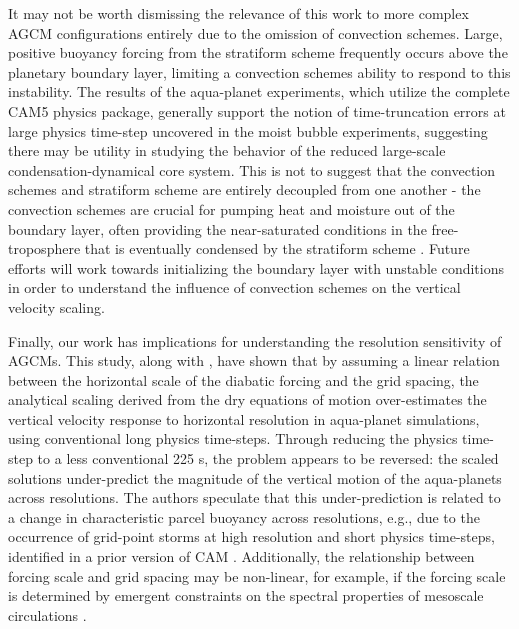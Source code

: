 It may not be worth dismissing the relevance of this work to more complex AGCM configurations entirely due to the omission of convection schemes. Large, positive buoyancy forcing from the stratiform scheme frequently occurs above the planetary boundary layer, limiting a convection schemes ability to respond to this instability. The results of the aqua-planet experiments, which utilize the complete CAM5 physics package, generally support the notion of time-truncation errors at large physics time-step uncovered in the moist bubble experiments, suggesting there may be utility in studying the behavior of the reduced large-scale condensation-dynamical core system. This is not to suggest that the convection schemes and stratiform scheme are entirely decoupled from one another - the convection schemes are crucial for pumping heat and moisture out of the boundary layer, often providing the near-saturated conditions in the free-troposphere that is eventually condensed by the stratiform scheme \citep{PETAL2014JCLIM}. Future efforts will work towards initializing the boundary layer with unstable conditions in order to understand the influence of convection schemes on the vertical velocity scaling. 

Finally, our work has implications for understanding the resolution sensitivity of AGCMs. This study, along with \cite{HR2017JCLIM}, have shown that by assuming a linear relation between the horizontal scale of the diabatic forcing and the grid spacing, the analytical scaling derived from the dry equations of motion over-estimates the vertical velocity response to horizontal resolution in aqua-planet simulations, using conventional long physics time-steps. Through reducing the physics time-step to a less conventional 225 s, the problem appears to be reversed: the scaled solutions under-predict the magnitude of the vertical motion of the aqua-planets across resolutions. The authors speculate that this under-prediction is related to a change in characteristic parcel buoyancy across resolutions, e.g., due to the occurrence of grid-point storms at high resolution and short physics time-steps, identified in a prior version of CAM \citep{W2013QJRMS}. Additionally, the relationship between forcing scale and grid spacing may be non-linear, for example, if the forcing scale is determined by emergent constraints on the spectral properties of mesoscale circulations \citep{RETAL2016CD,OETAL2016JAMES}. 

